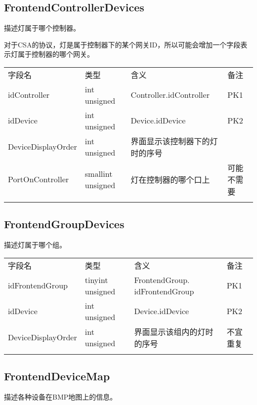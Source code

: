 \subsection{FrontendControllerDevices}\label{frontendcontrollerdevices}

描述灯属于哪个控制器。

对于CSA的协议，灯是属于控制器下的某个网关ID，所以可能会增加一个字段表示灯属于控制器的哪个网关。

\begin{longtabu}[c]{@{}lXXX@{}}
\toprule\addlinespace
字段名 & 类型 & 含义 & 备注
\\\addlinespace
\midrule\endhead
idController & int unsigned & Controller.idController & PK1
\\\addlinespace
idDevice & int unsigned & Device.idDevice & PK2
\\\addlinespace
DeviceDisplayOrder & int unsigned & 界面显示该控制器下的灯时的序号 &
\\\addlinespace
PortOnController & smallint unsigned & 灯在控制器的哪个口上 & 可能不需要
\\\addlinespace
\bottomrule
\end{longtabu}

\subsection{FrontendGroupDevices}\label{frontendgroupdevices}

描述灯属于哪个组。

\begin{longtabu}[c]{@{}lXXX@{}}
\toprule\addlinespace
字段名 & 类型 & 含义 & 备注
\\\addlinespace
\midrule\endhead
idFrontendGroup & tinyint unsigned & FrontendGroup. idFrontendGroup &
PK1
\\\addlinespace
idDevice & int unsigned & Device.idDevice & PK2
\\\addlinespace
DeviceDisplayOrder & int unsigned & 界面显示该组内的灯时的序号 &
不宜重复
\\\addlinespace
\bottomrule
\end{longtabu}

\subsection{FrontendDeviceMap}\label{frontenddevicemap}

描述各种设备在BMP地图上的信息。

